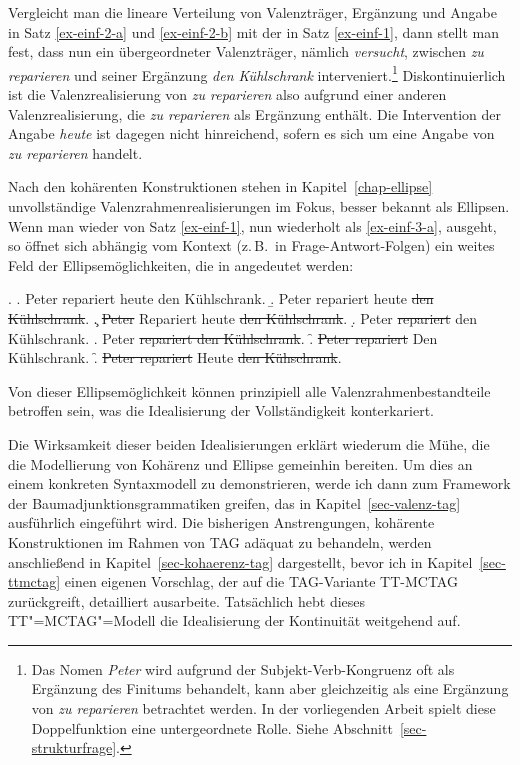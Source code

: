 Vergleicht man die lineare Verteilung von Valenzträger, Ergänzung und Angabe in Satz \ref{ex-einf-2-a} und \ref{ex-einf-2-b} mit der in Satz \ref{ex-einf-1}, dann stellt man fest, dass nun ein übergeordneter Valenzträger, nämlich {\it versucht}, zwischen \textit{zu reparieren} und seiner Ergänzung \textit{den Kühlschrank} interveniert.\footnote{Das Nomen {\it Peter} wird aufgrund der Subjekt-Verb-Kongruenz oft als Ergänzung des Finitums behandelt, kann aber gleichzeitig als eine Ergänzung von {\it zu reparieren} betrachtet werden. In der vorliegenden Arbeit spielt diese Doppelfunktion eine untergeordnete Rolle. Siehe Abschnitt~\ref{sec-strukturfrage}.}  Diskontinuierlich ist die Valenzrealisierung von \textit{zu reparieren} also aufgrund einer anderen Valenzrealisierung, die \textit{zu reparieren} als Ergänzung enthält. Die Intervention der Angabe \textit{heute} ist dagegen nicht hinreichend, sofern es sich um eine Angabe von \textit{zu reparieren} handelt.

Nach den kohärenten Konstruktionen stehen in Kapitel~\ref{chap-ellipse} unvollständige Valenzrahmenrealisierungen im Fokus, besser bekannt als Ellipsen. Wenn man wieder von Satz \ref{ex-einf-1}, nun wiederholt als \ref{ex-einf-3-a}, ausgeht, so öffnet sich abhängig vom Kontext (z.\,B.\ in Frage-Antwort-Folgen) ein weites Feld der Ellipsemöglichkeiten, die in \Next[b--g] angedeutet werden:       
  
  \ex. \label{ex-einf-3}
  \a. \label{ex-einf-3-a} Peter repariert heute den Kühlschrank. 
  \b. \label{ex-einf-3-b} Peter repariert heute \sout{den Kühlschrank}.
  \c. \sout{Peter} Repariert heute \sout{den Kühlschrank}.
  \d. Peter \sout{repariert} den Kühlschrank.
  \e. Peter \sout{repariert den Kühlschrank}.
  \f. \sout{Peter repariert} Den Kühlschrank.
  \f. \label{ex-einf-3-f} \sout{Peter repariert} Heute \sout{den Kühschrank}.

Von dieser Ellipsemöglichkeit können prinzipiell alle Valenzrahmenbestandteile betroffen sein, was die Idealisierung der Vollständigkeit konterkariert. 
  
Die Wirksamkeit dieser beiden Idealisierungen erklärt wiederum die Mühe, die die Modellierung von Kohärenz und Ellipse gemeinhin bereiten. Um dies an einem konkreten Syntaxmodell zu demonstrieren, werde ich dann zum Framework der Baumadjunktionsgrammatiken greifen, das in Kapitel~\ref{sec-valenz-tag} ausführlich eingeführt wird. Die bisherigen Anstrengungen, kohärente Konstruktionen im Rahmen von TAG adäquat zu behandeln, werden anschlie\ss end in Kapitel~\ref{sec-kohaerenz-tag} dargestellt, bevor ich in Kapitel~\ref{sec-ttmctag} einen eigenen Vorschlag, der auf die TAG-Variante TT-MCTAG zurückgreift, detailliert ausarbeite. Tatsächlich hebt dieses TT"=MCTAG"=Modell die Idealisierung der Kontinuität weitgehend auf. 

